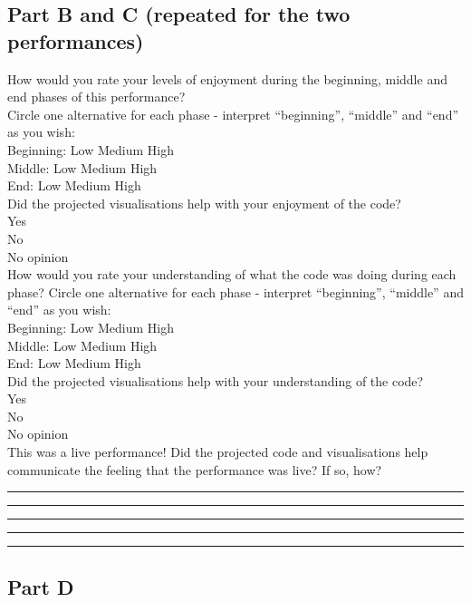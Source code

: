 \documentclass[12pt]{article}
\begin{document}
\subsection*{Part B and C (repeated for the two performances)}

How would you rate your levels of enjoyment during the beginning, middle and end phases of this performance?\\
Circle one alternative for each phase - interpret “beginning”, “middle” and “end” as you wish:\\

Beginning: Low Medium High\\

Middle: Low Medium High\\

End: Low Medium High\\

Did the projected visualisations help with your enjoyment of the code?\\
Yes\\
No\\
No opinion\\

How would you rate your understanding of what the code was doing during each phase? Circle one alternative for each phase - interpret “beginning”, “middle” and “end” as you wish:\\

Beginning: Low Medium High\\

Middle: Low Medium High\\

End: Low Medium High\\

Did the projected visualisations help with your understanding of the code?\\
Yes\\
No\\
No opinion\\

This was a live performance! Did the projected code and visualisations help communicate the feeling that the performance was live? If so, how?\\

\hrule \bigskip \hrule \bigskip \hrule \bigskip \hrule \bigskip \hrule

\subsection*{Part D}
\end{document}
